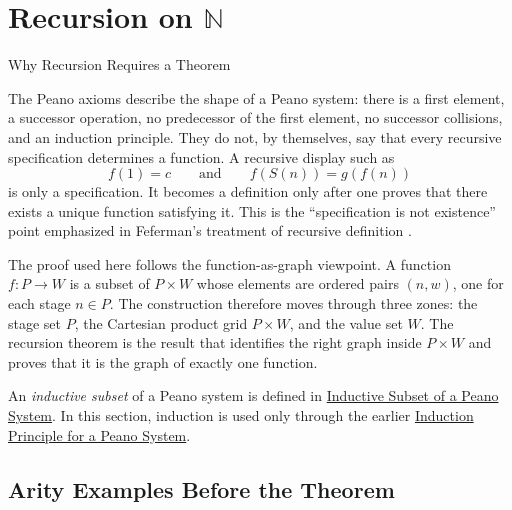 \section{Recursion on \texorpdfstring{$\mathbb{N}$}{N}}

\begin{topicbox}{Why Recursion Requires a Theorem}
\begin{exposition}
The Peano axioms describe the shape of a Peano system: there is a first
element, a successor operation, no predecessor of the first element, no
successor collisions, and an induction principle. They do not, by themselves,
say that every recursive specification determines a function. A recursive
display such as
\[
f(1)=c
\qquad\text{and}\qquad
f(S(n))=g(f(n))
\]
is only a specification. It becomes a definition only after one proves that
there exists a unique function satisfying it. This is the ``specification is
not existence'' point emphasized in Feferman's treatment of recursive
definition \cite[p.~67]{feferman1964numbersystems}.

The proof used here follows the function-as-graph viewpoint. A function
$f:P\to W$ is a subset of $P\times W$ whose elements are ordered pairs
$(n,w)$, one for each stage $n\in P$. The construction therefore moves through
three zones: the stage set $P$, the Cartesian product grid $P\times W$, and
the value set $W$. The recursion theorem is the result that identifies the
right graph inside $P\times W$ and proves that it is the graph of exactly one
function.
\end{exposition}

\begin{remark*}
An \emph{inductive subset} of a Peano system is defined in
\hyperref[def:inductive-subset-of-peano-system]{Inductive Subset of a Peano
System}. In this section, induction is used only through the earlier
\hyperref[thm:induction-principle-for-peano-system]{Induction Principle for a
Peano System}.
\end{remark*}
\end{topicbox}

\subsection{Arity Examples Before the Theorem}


